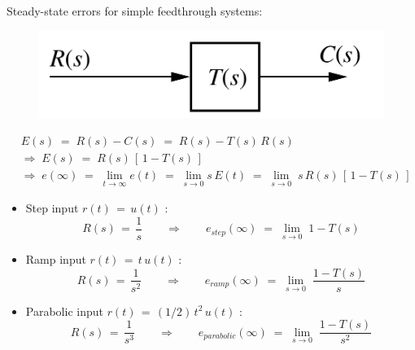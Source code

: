 \documentclass[ 10pt, xcolor = dvipsnames]{beamer}
\begin{document}
\begin{frame}[allowframebreaks]
\frametitle{\insertsection}

Steady-state errors for simple feedthrough systems: 
\fullskip

\begin{figure}
\centering
\includegraphics[width=0.4\columnwidth]{figures/Nise_Fig-7-3a.jpg}
\end{figure}
\begin{align*}
& E(s) \; = \; R(s) - C(s) \; = \; R(s) - T(s) \, R(s) \\[1ex]
& \Longrightarrow \; E(s) \; = \; R(s) \, [ \, 1 - T(s) \, ] \\[1ex]
& \Longrightarrow \; e(\infty) \; = \; 
\lim_{ t \rightarrow \infty } e(t) \; = \; 
\lim_{ s \rightarrow 0 } s \, E(t) \; = \; 
\lim_{ s \rightarrow 0 } \; s \, R(s) \, [ \, 1 - T(s) \, ]
\end{align*}
\framebreak

\begin{itemize}
\item Step input $r(t) \, = \, u(t)$ :
\[
R(s) \, = \, \frac{1}{s} \qquad \Longrightarrow \qquad
e_{step}(\infty) \; = \; 
\lim_{ s \rightarrow 0 } \; 1 - T(s)
\]
\item Ramp input $r(t) \, = \, t \, u(t)$ :
\[
R(s) \, = \, \frac{1}{s^2} \qquad \Longrightarrow \qquad
e_{ramp}(\infty) \; = \; 
\lim_{ s \rightarrow 0 } \; \frac{1 - T(s)}{s}
\]
\item Parabolic input $r(t) \, = \, (1/2) \, t^2 \, u(t)$ :
\[
R(s) \, = \, \frac{1}{s^3} \qquad \Longrightarrow \qquad
e_{parabolic}(\infty) \; = \; 
\lim_{ s \rightarrow 0 } \; \frac{1 - T(s)}{s^2}
\]
\end{itemize}

\end{frame}
\end{document}
